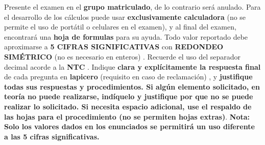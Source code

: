 \documentclass[12pt]{article}
\begin{document}
Presente el examen en el \textbf{grupo matriculado}, de lo contrario será anulado. %
Para el desarrollo de los cálculos puede usar \textbf{exclusivamente calculadora} (no se permite el uso de portátil o celulares en el examen), y %
al final del examen, encontrará una \textbf{hoja de formulas} para su ayuda. %
Todo valor reportado debe aproximarse a \textbf{5 CIFRAS SIGNIFICATIVAS} con \textbf{REDONDEO SIMÉTRICO} (no es necesario en enteros)%
. Recuerde el uso del separador decimal acorde a la \textbf{NTC} %
.
Indique \textbf{clara y explícitamente la respuesta final} de cada pregunta %
en \textbf{lapicero} (requisito en caso de reclamación) %
, y \textbf{justifique todas sus respuestas y procedimientos. Si algún elemento solicitado, en teoría no puede realizarse, indíquelo y justifique por que no se puede realizar lo solicitado. %
Si necesita espacio adicional, use el respaldo de las hojas para el procedimiento (no se permiten hojas extras)}. %
\textbf{Nota: Solo los valores dados en los enunciados se permitirá un uso diferente a las 5 cifras significativas.}
\end{document}
